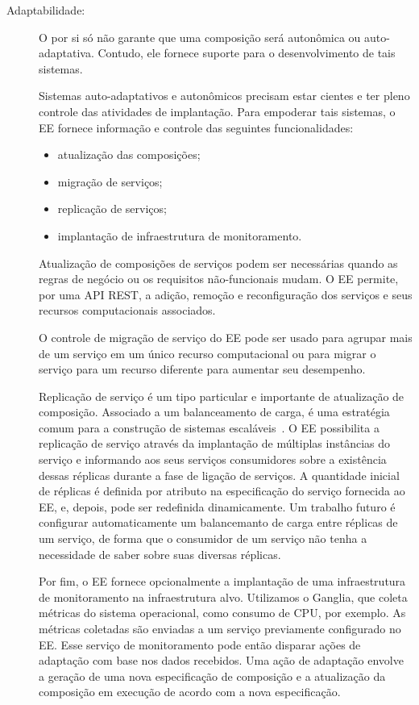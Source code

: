 \begin{description}
\item [Adaptabilidade:]

O \ee por si só não garante que uma composição será autonômica ou auto-adaptativa.
Contudo, ele fornece suporte para o desenvolvimento de tais sistemas.

Sistemas auto-adaptativos e autonômicos precisam estar cientes
e ter pleno controle das atividades de implantação.
Para empoderar tais sistemas, o EE fornece informação e controle
das seguintes funcionalidades:

\begin{itemize}
\item atualização das composições;
\item migração de serviços;
\item replicação de serviços;
\item implantação de infraestrutura de monitoramento.
\end{itemize}

Atualização de composições de serviços podem ser necessárias quando
as regras de negócio ou os requisitos não-funcionais mudam.
O EE permite, por uma API REST, a adição, remoção e reconfiguração dos serviços
e seus recursos computacionais associados.

O controle de migração de serviço do EE pode ser usado para 
agrupar mais de um serviço em um único
recurso computacional ou para migrar o serviço para um recurso diferente
para aumentar seu desempenho.

Replicação de serviço é um tipo particular e importante de atualização de composição.
Associado a um balanceamento de carga, é uma estratégia comum para
a construção de sistemas escaláveis~\cite{Amazon2012Practices}.
O EE possibilita a replicação de serviço através da implantação de
múltiplas instâncias do serviço e informando aos seus serviços consumidores
sobre a existência dessas réplicas durante a fase de ligação de serviços.
A quantidade inicial de réplicas é definida por atributo na especificação
do serviço fornecida ao EE, e, depois, pode ser redefinida dinamicamente.
Um trabalho futuro é configurar automaticamente um balancemanto de carga
entre réplicas de um serviço, de forma que o consumidor de um serviço
não tenha a necessidade de saber sobre suas diversas réplicas.

Por fim, o EE fornece opcionalmente a implantação de uma infraestrutura de monitoramento na infraestrutura alvo.
Utilizamos o Ganglia, que coleta métricas do sistema operacional, como consumo de CPU, por exemplo.
As métricas coletadas são enviadas a um serviço previamente configurado no EE.
Esse serviço de monitoramento pode então disparar ações de adaptação com base
nos dados recebidos. Uma ação de adaptação envolve a geração de uma nova especificação
de composição e a atualização da composição em execução de acordo com a nova especificação.


\end{description}
